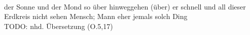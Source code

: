 \begin{exe}
\ex \label{ex:O68453} \gll {}                       \object{;} \\
{der} {Sonne} {und} {der} {Mond} {so} {über} {hinweggehen (über)} {er} {schnell} {} {und} {all} {dieser} {Erdkreis} {} {nicht} {sehen} {Mensch; Mann} {eher} {jemals} {solch} {Ding} {}\\
\glt TODO: nhd. Übersetzung (O.5,17)
\end{exe}
